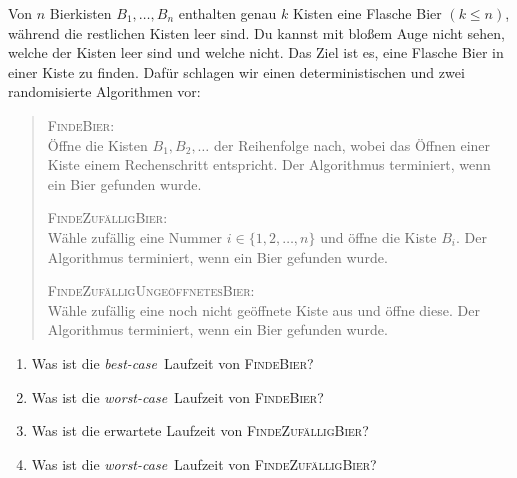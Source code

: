 \documentclass{uebung_cs}
\begin{document}
\begin{aufgabe}[Bierkisten]
	Von $n$ Bierkisten $B_1,\dots,B_n$ enthalten genau $k$ Kisten eine Flasche Bier $(k \leq n)$, während die restlichen Kisten leer sind. Du kannst mit bloßem Auge nicht sehen, welche der Kisten leer sind und welche nicht. Das Ziel ist es, eine Flasche Bier in einer Kiste zu finden. Dafür schlagen wir einen deterministischen und zwei randomisierte Algorithmen vor:
	\begin{quote}
		\textsc{FindeBier}:\\
		Öffne die Kisten $B_1,B_2,\dots$ der Reihenfolge nach, wobei das Öffnen einer Kiste einem Rechenschritt entspricht.
		Der Algorithmus terminiert, wenn ein Bier gefunden wurde. 

		\textsc{FindeZufälligBier}:\\
		Wähle zufällig eine Nummer $i \in \{1,2,\dots,n\}$ und öffne die Kiste $B_i$.
		Der Algorithmus terminiert, wenn ein Bier gefunden wurde. 

		\textsc{FindeZufälligUngeöffnetesBier}:\\
		Wähle zufällig eine noch nicht geöffnete Kiste aus und öffne diese.	
		Der Algorithmus terminiert, wenn ein Bier gefunden wurde. 
	\end{quote}
	
	\begin{enumerate}
		\item Was ist die \textit{best-case}~Laufzeit von \textsc{FindeBier}?
		\item Was ist die \textit{worst-case}~Laufzeit von \textsc{FindeBier}?
	\end{enumerate}
		
	\begin{enumerate}
		\setcounter{enumi}{2}
		\item Was ist die erwartete Laufzeit von \textsc{FindeZufälligBier}?
		\item Was ist die \textit{worst-case}~Laufzeit von \textsc{FindeZufälligBier}?
	\end{enumerate}	
	

\end{aufgabe}
\end{document}
